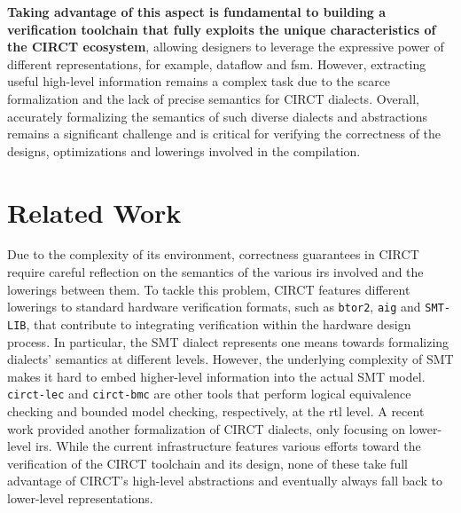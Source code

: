 \documentclass[acmtog]{acmart}
\begin{document}
\textbf{Taking advantage of this aspect is fundamental to building a verification toolchain that fully exploits the unique characteristics 
of the CIRCT ecosystem}, allowing designers to leverage the expressive power of different representations, for example, dataflow and \ac{fsm}. 
However, extracting useful high-level information remains a complex task due to the scarce formalization and the lack of precise 
semantics for CIRCT dialects. Overall, accurately formalizing the semantics of such diverse dialects and abstractions remains a 
significant challenge and is critical for verifying the correctness of the designs, optimizations and lowerings involved in the compilation. 
\section{Related Work}

Due to the complexity of its environment, correctness guarantees in CIRCT require careful reflection on the semantics of the various \acp{ir} involved and the lowerings between them. 
To tackle this problem, CIRCT features different lowerings to standard hardware verification formats, such as \texttt{btor2}\cite{btor2, niemetz2018btor2}, \texttt{aig}\cite{aiger2} and \texttt{SMT-LIB}, that contribute to integrating 
verification within the hardware design process.
In particular, the SMT dialect represents one means towards formalizing dialects' semantics at different levels. 
However, the underlying complexity of SMT makes it hard to embed higher-level information into the actual SMT model\cite{gurfinkel2022program}.
\texttt{circt-lec} and \texttt{circt-bmc} are other tools that perform logical equivalence checking and bounded model checking, respectively, at the \ac{rtl} level. 
A recent work\cite{zhao2024kcirct} provided another formalization of CIRCT dialects, only focusing on lower-level \acp{ir}. 
While the current infrastructure features various efforts toward the verification of the CIRCT toolchain and its design, none of these 
take full advantage of CIRCT's high-level abstractions and eventually always fall back to lower-level representations.  
\end{document}
